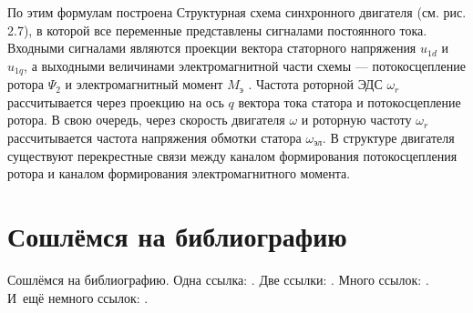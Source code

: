 По этим формулам построена Структурная схема синхронного двигателя (см. рис. 2.7), в которой все переменные представлены сигналами постоянного тока. Входными сигналами являются проекции вектора статорного напряжения $u_{1 d}$ и $u_{1q}$, а выходными величинами электромагнитной части схемы — потокосцепление ротора ${\Psi }_{2}$ и электромагнитный момент $M_{\text{э}}$ . Частота роторной ЭДС $\omega_{r}$ рассчитывается через проекцию на ось $q$ вектора тока статора и потокосцепление ротора. В свою очередь, через скорость двигателя $\omega$ и роторную частоту $\omega_{r}$ рассчитывается частота напряжения обмотки статора $\omega_{\text{эл}}$. В структуре двигателя существуют перекрестные связи между каналом формирования потокосцепления ротора и каналом формирования электромагнитного момента.


\section{Сошлёмся на библиографию} \label{sec:ch1/sec4}


Сошлёмся на библиографию.
Одна ссылка: \cite[с.~54]{Sokolov}\cite[с.~36]{Gaidaenko}.
Две ссылки: \cite{Sokolov,Gaidaenko}.
Много ссылок: %
\cite{Lermontov, Management, Borozda, Marketing, Constitution, FamilyCode,
Gost.7.0.53, Razumovski, Lagkueva, Pokrovski, Methodology, Nasirova, Berestova,
Kriger}%
%
.
И~ещё немного ссылок:
\cite{Article,Book,Booklet,Conference,Inbook,Incollection,Manual,Mastersthesis,
Misc,Phdthesis,Proceedings,Techreport,Unpublished}
\cite{medvedev2006jelektronnye, CEAT:CEAT581, doi:10.1080/01932691.2010.513279,
Gosele1999161,Li2007StressAnalysis, Shoji199895, test:eisner-sample,
test:eisner-sample-shorted, AB_patent_Pomerantz_1968, iofis_patent1960}
%
.

%


